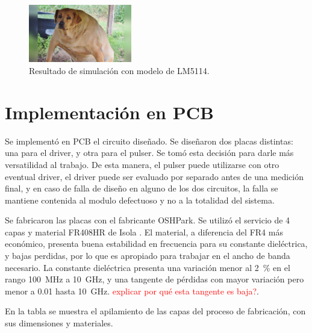 \begin{figure}[tbp]
    \centering
    \includegraphics[width=0.4\textwidth]{images/placeholder.jpg}
    \caption{Resultado de simulación con modelo de LM5114.}
    \label{fig:lm5114_sim_result}
\end{figure}

\section{Implementación en PCB}

Se implementó en PCB el circuito diseñado. Se diseñaron dos placas distintas:
una para el driver, y otra para el pulser. Se tomó esta decisión para darle más
versatilidad al trabajo. De esta manera, el pulser puede utilizarse con otro
eventual driver, el driver puede ser evaluado por separado antes de una medición
final, y en caso de falla de diseño en alguno de los dos circuitos, la falla se
mantiene contenida al modulo defectuoso y no a la totalidad del sistema.

Se fabricaron las placas con el fabricante OSHPark. Se utilizó el servicio de 4
capas y material FR408HR de Isola \cite{fr408_datasheet}. El material, a
diferencia del FR4 más económico, presenta buena estabilidad en frecuencia para
su constante dieléctrica, y bajas perdidas, por lo que es apropiado para
trabajar en el ancho de banda necesario. La constante dieléctrica presenta una
variación menor al \qty{2}{\percent} en el rango \qty{100}{\mega\hertz} a
\qty{10}{\giga\hertz}, y una tangente de pérdidas con mayor variación pero menor
a \num{0.01} hasta \qty{10}{\giga\hertz}. \textcolor{red}{explicar por qué esta
tangente es baja?}.

En la tabla se muestra el apilamiento de las capas del proceso de fabricación,
con sus dimensiones y materiales.

